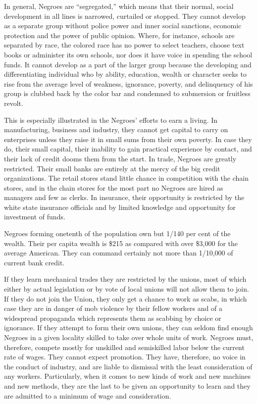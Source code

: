 \documentclass[letterpaper,10pt,english]{jupyterBook}
\begin{document}
\sphinxAtStartPar
In general, Negroes are “segregated,” which means that their normal, social development in all lines is narrowed, curtailed or stopped. They cannot develop as a separate group without police power and inner social sanctions, economic protection and the power of public opinion. Where, for instance, schools are separated by race, the colored race has no power to select teachers,  choose text books or administer its own schools, nor does it have voice in spending the school funds. It cannot develop as a part of the larger group because the developing and differentiating individual who by ability, education, wealth or character seeks to rise from the average level of weakness, ignorance, poverty, and delinquency of his group is clubbed back by the color bar and condemned to submersion or fruitless revolt.

\sphinxAtStartPar
This is especially illustrated in the Negroes’ efforts to earn a living. In manufacturing, business and industry, they cannot get capital to carry on enterprises unless they raise it in small sums from their own poverty. In case they do, their small capital, their inability to gain practical experience by contact, and their lack of credit dooms them from the start. In trade, Negroes are greatly restricted. Their small banks are entirely at the mercy of the big credit organizations. The retail stores stand little chance in competition with the chain stores, and in the chain stores for the most part no Negroes are hired as managers and few as clerks. In insurance, their opportunity is restricted by the white state insurance officials and by limited knowledge and opportunity for investment of funds.

\sphinxAtStartPar
Negroes forming one\sphinxhyphen{}tenth of the population own but 1/140 per cent of the wealth. Their per capita wealth is \$215 as compared with over \$3,000 for the average American. They can command certainly not more than 1/10,000 of current bank credit.

\sphinxAtStartPar
If they learn mechanical trades they are restricted by the unions, most of which either by actual legislation or by vote of local unions will not allow them to join. If they do not join the Union, they only get a chance to work as scabs, in which case they are in danger of mob violence by their fellow workers and of a widespread propaganda which represents them as scabbing by choice or ignorance. If they attempt to form their own unions, they can seldom find enough Negroes in a given locality skilled to take over whole units of work. Negroes must, therefore, compete mostly for unskilled and semi\sphinxhyphen{}skilled labor below the current rate of wages. They cannot expect promotion. They have, therefore, no voice in the conduct of industry, and are liable to dismissal with the least consideration of any workers. Particularly, when it comes to new kinds of work and new machines and new methods, they are the last to be given an opportunity to learn and they are admitted to a minimum of wage and consideration.
\end{document}
